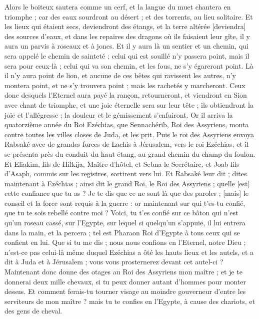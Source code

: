 \begin{multicols}{2}
Alors le boiteux sautera comme un cerf, et la langue du muet chantera en triomphe ; car des eaux sourdront au désert ; et des torrents, au lieu solitaire.
Et les lieux qui étaient secs, deviendront des étangs, et la terre altérée [deviendra] des sources d'eaux, et dans les repaires des dragons où ils faisaient leur gîte, il y aura un parvis à roseaux et à joncs.
Et il y aura là un sentier et un chemin, qui sera appelé le chemin de sainteté ; celui qui est souillé n'y passera point, mais il sera pour ceux-là ; celui qui va son chemin, et les fous, ne s'y égareront point.
Là il n'y aura point de lion, et aucune de ces bêtes qui ravissent les autres, n'y montera point, et ne s'y trouvera point ; mais les rachetés y marcheront.
Ceux donc desquels l'Eternel aura payé la rançon, retourneront, et viendront en Sion avec chant de triomphe, et une joie éternelle sera sur leur tête ; ils obtiendront la joie et l'allégresse ; la douleur et le gémissement s'enfuiront.
\VerseOne{}Or il arriva la quatorzième année du Roi Ezéchias, que Sennachérib, Roi des Assyriens, monta contre toutes les villes closes de Juda, et les prit.
Puis le roi des Assyriens envoya Rabsaké avec de grandes forces de Lachis à Jérusalem, vers le roi Ezéchias, et il se présenta près du conduit du haut étang, au grand chemin du champ du foulon.
Et Eliakim, fils de Hilkija, Maître d'hôtel, et Sebna le Secrétaire, et Joab fils d'Asaph, commis sur les registres, sortirent vers lui.
Et Rabsaké leur dit ; dites maintenant à Ezéchias ; ainsi dit le grand Roi, le Roi des Assyriens ; quelle [est] cette confiance que tu as ?
Je te dis que ce ne sont là que des paroles ; [mais] le conseil et la force sont requis à la guerre : or maintenant sur qui t'es-tu confié, que tu te sois rebellé contre moi ?
Voici, tu t'es confié sur ce bâton qui n'est qu'un roseau cassé, sur l'Egypte, sur lequel si quelqu'un s'appuie, il lui entrera dans la main, et la percera ; tel est Pharaon Roi d'Egypte à tous ceux qui se confient en lui.
Que si tu me dis ; nous nous confions en l'Eternel, notre Dieu ; n'est-ce pas celui-là même duquel Ezéchias a ôté les hauts lieux et les autels, et a dit à Juda et à Jérusalem ; vous vous prosternerez devant cet autel-ci ?
Maintenant donc donne des otages au Roi des Assyriens mon maître ; et je te donnerai deux mille chevaux, si tu peux donner autant d'hommes pour monter dessus.
Et comment ferais-tu tourner visage au moindre gouverneur d'entre les serviteurs de mon maître ? mais tu te confies en l'Egypte, à cause des chariots, et des gens de cheval.

\end{multicols}

